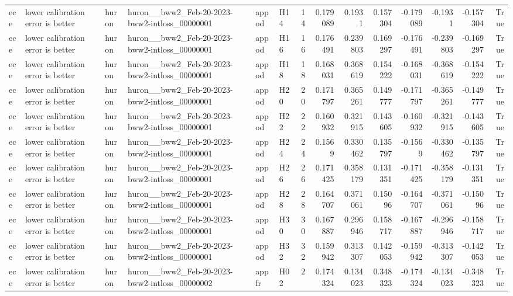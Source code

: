 \begin{longtable}{llllllrrrrrrrr}
ece & lower calibration error is better & huron & huron\_\_bww2\_Feb-20-2023-bww2-intloss\_00000001 & appod & H14 & 14 & 0.179089 & 0.1931 & 0.157304 & -0.179089 & -0.1931 & -0.157304 & True \\
ece & lower calibration error is better & huron & huron\_\_bww2\_Feb-20-2023-bww2-intloss\_00000001 & appod & H16 & 16 & 0.176491 & 0.239803 & 0.169297 & -0.176491 & -0.239803 & -0.169297 & True \\
ece & lower calibration error is better & huron & huron\_\_bww2\_Feb-20-2023-bww2-intloss\_00000001 & appod & H18 & 18 & 0.168031 & 0.368619 & 0.154222 & -0.168031 & -0.368619 & -0.154222 & True \\
ece & lower calibration error is better & huron & huron\_\_bww2\_Feb-20-2023-bww2-intloss\_00000001 & appod & H20 & 20 & 0.171797 & 0.365261 & 0.149777 & -0.171797 & -0.365261 & -0.149777 & True \\
ece & lower calibration error is better & huron & huron\_\_bww2\_Feb-20-2023-bww2-intloss\_00000001 & appod & H22 & 22 & 0.160932 & 0.321915 & 0.143605 & -0.160932 & -0.321915 & -0.143605 & True \\
ece & lower calibration error is better & huron & huron\_\_bww2\_Feb-20-2023-bww2-intloss\_00000001 & appod & H24 & 24 & 0.1569 & 0.330462 & 0.135797 & -0.1569 & -0.330462 & -0.135797 & True \\
ece & lower calibration error is better & huron & huron\_\_bww2\_Feb-20-2023-bww2-intloss\_00000001 & appod & H26 & 26 & 0.171425 & 0.358179 & 0.131351 & -0.171425 & -0.358179 & -0.131351 & True \\
ece & lower calibration error is better & huron & huron\_\_bww2\_Feb-20-2023-bww2-intloss\_00000001 & appod & H28 & 28 & 0.164707 & 0.371061 & 0.15096 & -0.164707 & -0.371061 & -0.15096 & True \\
ece & lower calibration error is better & huron & huron\_\_bww2\_Feb-20-2023-bww2-intloss\_00000001 & appod & H30 & 30 & 0.167887 & 0.296946 & 0.158717 & -0.167887 & -0.296946 & -0.158717 & True \\
ece & lower calibration error is better & huron & huron\_\_bww2\_Feb-20-2023-bww2-intloss\_00000001 & appod & H32 & 32 & 0.159942 & 0.313307 & 0.142053 & -0.159942 & -0.313307 & -0.142053 & True \\
ece & lower calibration error is better & huron & huron\_\_bww2\_Feb-20-2023-bww2-intloss\_00000002 & appfr & H02 & 2 & 0.174324 & 0.134023 & 0.348323 & -0.174324 & -0.134023 & -0.348323 & True \\

\end{longtable}
